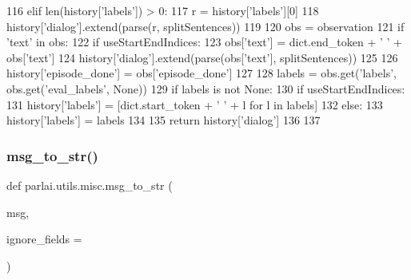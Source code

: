 \begin{DoxyCode}
116         \textcolor{keywordflow}{elif} len(history[\textcolor{stringliteral}{'labels'}]) > 0:
117             r = history[\textcolor{stringliteral}{'labels'}][0]
118             history[\textcolor{stringliteral}{'dialog'}].extend(parse(r, splitSentences))
119 
120     obs = observation
121     \textcolor{keywordflow}{if} \textcolor{stringliteral}{'text'} \textcolor{keywordflow}{in} obs:
122         \textcolor{keywordflow}{if} useStartEndIndices:
123             obs[\textcolor{stringliteral}{'text'}] = dict.end\_token + \textcolor{stringliteral}{' '} + obs[\textcolor{stringliteral}{'text'}]
124         history[\textcolor{stringliteral}{'dialog'}].extend(parse(obs[\textcolor{stringliteral}{'text'}], splitSentences))
125 
126     history[\textcolor{stringliteral}{'episode\_done'}] = obs[\textcolor{stringliteral}{'episode\_done'}]
127 
128     labels = obs.get(\textcolor{stringliteral}{'labels'}, obs.get(\textcolor{stringliteral}{'eval\_labels'}, \textcolor{keywordtype}{None}))
129     \textcolor{keywordflow}{if} labels \textcolor{keywordflow}{is} \textcolor{keywordflow}{not} \textcolor{keywordtype}{None}:
130         \textcolor{keywordflow}{if} useStartEndIndices:
131             history[\textcolor{stringliteral}{'labels'}] = [dict.start\_token + \textcolor{stringliteral}{' '} + l \textcolor{keywordflow}{for} l \textcolor{keywordflow}{in} labels]
132         \textcolor{keywordflow}{else}:
133             history[\textcolor{stringliteral}{'labels'}] = labels
134 
135     \textcolor{keywordflow}{return} history[\textcolor{stringliteral}{'dialog'}]
136 
137 
\end{DoxyCode}
\mbox{\label{namespaceparlai_1_1utils_1_1misc_ae5db473b41d3b49814e2566e866282b6}} 
\subsubsection{\texorpdfstring{msg\+\_\+to\+\_\+str()}{msg\_to\_str()}}
{\footnotesize\ttfamily def parlai.\+utils.\+misc.\+msg\+\_\+to\+\_\+str (\begin{DoxyParamCaption}\item[{}]{msg,  }\item[{}]{ignore\+\_\+fields = {\ttfamily \textquotesingle{}\textquotesingle{}} }\end{DoxyParamCaption})}

